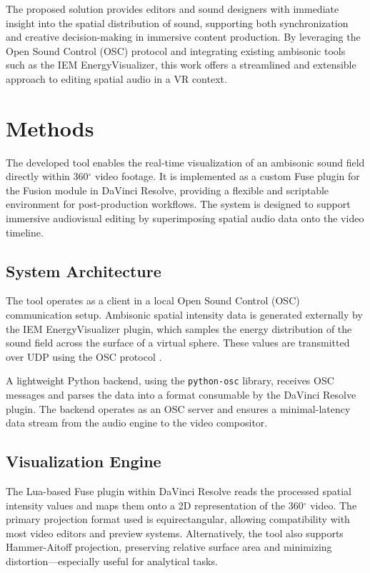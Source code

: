 \documentclass[convention,student-expo]{aesconf} %
\begin{document}
The proposed solution provides editors and sound designers with immediate insight into the spatial distribution of sound, supporting both synchronization and creative decision-making in immersive content production. By leveraging the Open Sound Control (OSC) protocol and integrating existing ambisonic tools such as the IEM EnergyVisualizer, this work offers a streamlined and extensible approach to editing spatial audio in a VR context.

\section{Methods}

The developed tool enables the real-time visualization of an ambisonic sound field directly within 360$^\circ$ video footage. It is implemented as a custom Fuse plugin for the Fusion module in DaVinci Resolve, providing a flexible and scriptable environment for post-production workflows. The system is designed to support immersive audiovisual editing by superimposing spatial audio data onto the video timeline.

\subsection{System Architecture}

The tool operates as a client in a local Open Sound Control (OSC) communication setup. Ambisonic spatial intensity data is generated externally by the IEM EnergyVisualizer plugin, which samples the energy distribution of the sound field across the surface of a virtual sphere. These values are transmitted over UDP using the OSC protocol \citep{wright2005osc,osc_spec}.

A lightweight Python backend, using the \texttt{python-osc} library, receives OSC messages and parses the data into a format consumable by the DaVinci Resolve plugin. The backend operates as an OSC server and ensures a minimal-latency data stream from the audio engine to the video compositor.

\subsection{Visualization Engine}

The Lua-based Fuse plugin within DaVinci Resolve reads the processed spatial intensity values and maps them onto a 2D representation of the 360$^\circ$ video. The primary projection format used is equirectangular, allowing compatibility with most video editors and preview systems. Alternatively, the tool also supports Hammer-Aitoff projection, preserving relative surface area and minimizing distortion—especially useful for analytical tasks.
\end{document}
